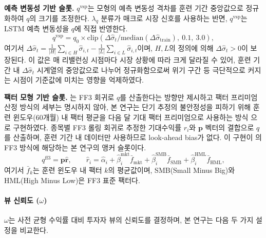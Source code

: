 \documentclass{article}
\begin{document}
\textbf{예측 변동성 기반 슬롯.} $q^{\mathrm{vsp}}$는 모형의 예측 변동성 격차를 훈련 기간 중앙값으로 정규화하여 $q$의 크기를 조정한다. $\lambda_q$ 분류가 매크로 시장 신호를 사용하는 반면, $q^{\mathrm{vsp}}$는 LSTM 예측 변동성을 $q$에 직접 반영한다.
\begin{equation}
  q^{\mathrm{vsp}} = q_0 \times \mathrm{clip}\!\left(\Delta\hat{\sigma}_t/\mathrm{median}(\Delta\hat{\sigma}_{\mathrm{train}}),\ 0.1,\ 3.0\right),
\end{equation}
여기서 $\Delta\hat{\sigma}_t = \frac{1}{|H|}\sum_{i\in H}\hat{\sigma}_{i,t} - \frac{1}{|L|}\sum_{i\in L}\hat{\sigma}_{i,t}$이며, $H, L$의 정의에 의해 $\Delta\hat{\sigma}_t > 0$이 보장된다. 이 값은 매 리밸런싱 시점마다 시장 상황에 따라 크게 달라질 수 있어, 훈련 기간 내 $\Delta\hat{\sigma}_t$ 시계열의 중앙값으로 나누어 정규화함으로써 위기 구간 등 극단적으로 커지는 시점이 기준값에 미치는 영향을 억제하였다.

\textbf{팩터 모형 기반 슬롯.} \citet{pyo2018}는 FF3 회귀로 $q$를 산출한다는 방향만 제시하고 팩터 프리미엄 산정 방식의 세부는 명시하지 않아, 본 연구는 단기 추정의 불안정성을 피하기 위해 훈련 윈도우(60개월) 내 팩터 평균을 다음 달 기대 팩터 프리미엄으로 사용하는 방식 \citep{fama1973risk, cochrane2005} 으로 구현하였다. 종목별 FF3 롤링 회귀로 추정한 기대수익률 $\hat{r}_i$와 $\mathbf{p}$ 벡터의 결합으로 $q$를 산출하며, 훈련 기간 내 데이터만 사용하므로 look-ahead bias가 없다. 이 구현이 \citet{pyo2018}의 FF3 방식에 해당하는 본 연구의 앵커 슬롯이다.
\begin{equation}
  q^{\mathrm{ff3}} = \mathbf{p}\hat{\mathbf{r}}, \qquad
  \hat{r}_i = \hat{\alpha}_i + \hat{\beta}_i^{\mathrm{mkt}}\bar{f}_{\mathrm{mkt}} + \hat{\beta}_i^{\mathrm{SMB}}\bar{f}_{\mathrm{SMB}} + \hat{\beta}_i^{\mathrm{HML}}\bar{f}_{\mathrm{HML}},
\end{equation}
여기서 $\bar{f}_k$는 훈련 윈도우 내 팩터 $k$의 평균값이며, SMB(Small Minus Big)와 HML(High Minus Low)은 FF3 표준 팩터다.

\paragraph{뷰 신뢰도 ($\omega$)}

$\omega$는 사전 균형 수익률 대비 투자자 뷰의 신뢰도를 결정하며, 본 연구는 다음 두 가지 설정을 비교한다.
\end{document}
